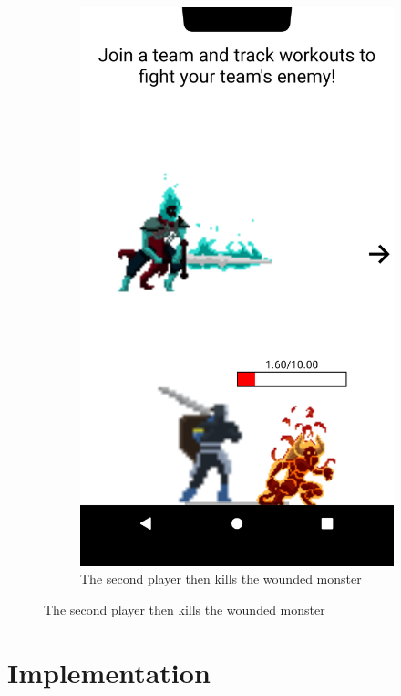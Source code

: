 \documentclass{l4proj}
\begin{document}
\begin{figure}[H]
\begin{subfigure}{0.45\textwidth}
        \includegraphics[width=\textwidth]{lower_attack.png}
        \caption{The second player then kills the wounded monster} 
    \end{subfigure}
\end{figure}


\chapter{Implementation}
\end{document}
